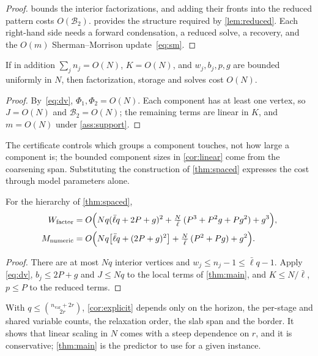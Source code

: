 \begin{proof}
 bounds the interior factorizations, and adding their fronts into
the reduced pattern costs $O(\mathcal B_2)$.  provides the
structure required by \cref{lem:reduced}. Each right-hand side needs a forward
condensation, a reduced solve, a recovery, and the $O(m)$ Sherman--Morrison
update~\eqref{eq:sm}.
\end{proof}

\begin{corollary}\label{cor:linear}
If in addition $\sum_jn_j=O(N)$, $K=O(N)$, and $w_j,b_j,p,g$ are bounded uniformly
in $N$, then factorization, storage and solves cost $O(N)$.
\end{corollary}

\begin{proof}
By~\eqref{eq:dv}, $\Phi_1,\Phi_2=O(N)$. Each component has at least one vertex, so
$J=O(N)$ and $\mathcal B_2=O(N)$; the remaining terms are linear in $K$, and
$m=O(N)$ under \cref{ass:support}.
\end{proof}

The certificate controls which groups a component touches, not how large a
component is; the bounded component sizes in \cref{cor:linear} come from the
coarsening span. Substituting the construction of \cref{thm:spaced} expresses
the cost through model parameters alone.

\begin{corollary}\label{cor:explicit}
For the hierarchy of \cref{thm:spaced},
\begin{align}
W_{\mathrm{factor}}&=O\Bigl(Nq(\bar\ell q+2P+g)^2+\tfrac{N}{\bar\ell}\,(P^3+P^2g+Pg^2)+g^3\Bigr),\label{eq:explicit-w}\\
M_{\mathrm{numeric}}&=O\Bigl(Nq\bigl[\bar\ell q+(2P+g)^2\bigr]+\tfrac{N}{\bar\ell}\,(P^2+Pg)+g^2\Bigr).\label{eq:explicit-m}
\end{align}
\end{corollary}

\begin{proof}
There are at most $Nq$ interior vertices and $w_j\le n_j-1\le\bar\ell q-1$. Apply
\eqref{eq:dv}, $b_j\le2P+g$ and $J\le Nq$ to the local terms of \cref{thm:main},
and $K\le N/\bar\ell$, $p\le P$ to the reduced terms.
\end{proof}

With $q\le\binom{n_{\mathrm{var}}+2r}{2r}$, \cref{cor:explicit} depends only on
the horizon, the per-stage and shared variable counts, the relaxation order, the
slab span and the border. It shows that linear scaling in $N$ comes with a steep
dependence on $r$, and it is conservative; \cref{thm:main} is the predictor to use
for a given instance.

